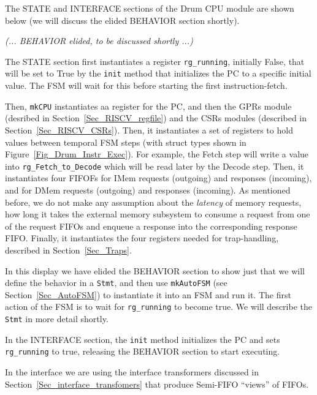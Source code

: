 \label{Sec_Drum_CPU_module}


The STATE and INTERFACE sections of the Drum CPU module are shown
below (we will discuss the elided BEHAVIOR section shortly).



\hm \emph{(... BEHAVIOR elided, to be discussed shortly ...)}



The STATE section first instantiates a register \verb|rg_running|,
initially False, that will be set to True by the \verb|init| method
that initializes the PC to a specific initial value.  The FSM will
wait for this before starting the first instruction-fetch.

Then, \verb|mkCPU| instantiates aa register for the PC, and then the
GPRs module (desribed in Section~\ref{Sec_RISCV_regfile}) and the CSRs
modules (described in Section~\ref{Sec_RISCV_CSRs}).  Then, it
instantiates a set of registers to hold values between temporal FSM
steps (with struct types shown in Figure~\ref{Fig_Drum_Instr_Exec}).
For example, the Fetch step will write a value into
\verb|rg_Fetch_to_Decode| which will be read later by the Decode step.
Then, it instantiates four FIFOFs for IMem requests (outgoing) and
responses (incoming), and for DMem requests (outgoing) and responses
(incoming). As mentioned before, we do not make any assumption about
the \emph{latency} of memory requests, {\ie} how long it takes the
external memory subsystem to consume a request from one of the request
FIFOs and enqueue a response into the corresponding response FIFO.
Finally, it instantiates the four registers needed for trap-handling,
described in Section~\ref{Sec_Traps}.

In this display we have elided the BEHAVIOR section to show just that
we will define the behavior in a \verb|Stmt|, and then use
\verb|mkAutoFSM| (see Section~\ref{Sec_AutoFSM}) to instantiate it
into an FSM and run it.  The first action of the FSM is to wait for
\verb|rg_running| to become true.  We will describe the \verb|Stmt| in
more detail shortly.

In the INTERFACE section, the \verb|init| method initializes the PC
and sets \verb|rg_running| to true, releasing the BEHAVIOR section to
start executing.

In the interface we are using the interface transformers discussed in
Section~\ref{Sec_interface_transfomers} that produce Semi-FIFO
``views'' of FIFOs.

